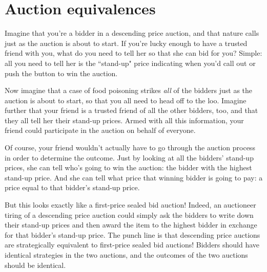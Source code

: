 \begin{comment}
Our conclusion: bidders have an incentive to shade their bids below their true values in a first-price auction, but not in a second-price auction. So it's no longer clear that first-price auctions will yield higher profits than second-price auctions!

\end{comment}

\section{Auction equivalences}

Imagine that you're a bidder in a descending price auction, and that nature calls just as the auction is about to start. If you're lucky enough to have a trusted friend with you, what do you need to tell her so that she can bid for you? Simple: all you need to tell her is the ``stand-up" price indicating when you'd call out or push the button to win the auction.

Now imagine that a case of food poisoning strikes \emph{all} of the bidders just as the auction is about to start, so that you all need to head off to the loo. Imagine further that your friend is a trusted friend of all the other bidders, too, and that they all tell her their stand-up prices. Armed with all this information, your friend could participate in the auction on behalf of everyone.

Of course, your friend wouldn't actually have to go through the auction process in order to determine the outcome. Just by looking at all the bidders' stand-up prices, she can tell who's going to win the auction: the bidder with the highest stand-up price. And she can tell what price that winning bidder is going to pay: a price equal to that bidder's stand-up price.

But this looks exactly like a first-price sealed bid auction! Indeed, an auctioneer tiring of a descending price auction could simply ask the bidders to write down their stand-up prices and then award the item to the highest bidder in exchange for that bidder's stand-up price. The punch line is that descending price auctions are strategically equivalent to first-price sealed bid auctions! Bidders should have identical strategies in the two auctions, and the outcomes of the two auctions should be identical.


